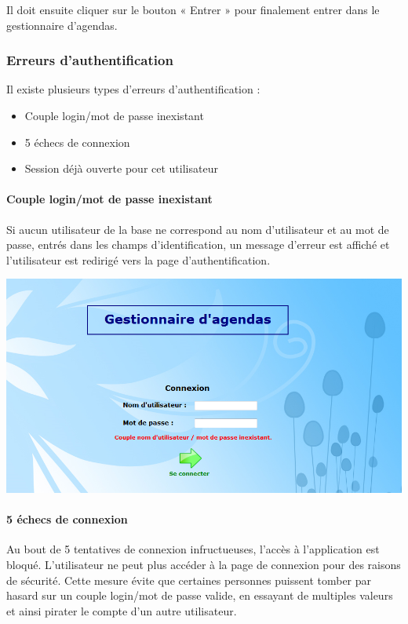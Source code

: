 \documentclass[12pt , a4paper]{article}
\begin{document}
\noindent Il doit ensuite cliquer sur le bouton « Entrer » pour finalement entrer dans le gestionnaire
d’agendas.

\subsubsection{Erreurs d'authentification}
\noindent Il existe plusieurs types d’erreurs d’authentification :
\begin{itemize}
\item Couple login/mot de passe inexistant
\item 5 échecs de connexion
\item Session déjà ouverte pour cet utilisateur
\end{itemize}

\paragraph{Couple login/mot de passe inexistant\\}
 Si aucun utilisateur de la base ne correspond au nom d’utilisateur et au mot de passe, entrés
dans les champs d’identification, un message d’erreur est affiché et l’utilisateur est redirigé vers
la page d’authentification.

\begin{center}
  \includegraphics[scale=0.6]{./images/authentification3.png}
\end{center}


\paragraph{5 échecs de connexion\\}
Au bout de 5 tentatives de connexion infructueuses, l’accès à l’application est bloqué.
L’utilisateur ne peut plus accéder à la page de connexion pour des raisons de sécurité. Cette
mesure évite que certaines personnes puissent tomber par hasard sur un couple login/mot de
passe valide, en essayant de multiples valeurs et ainsi pirater le compte d’un autre utilisateur.
\end{document}
